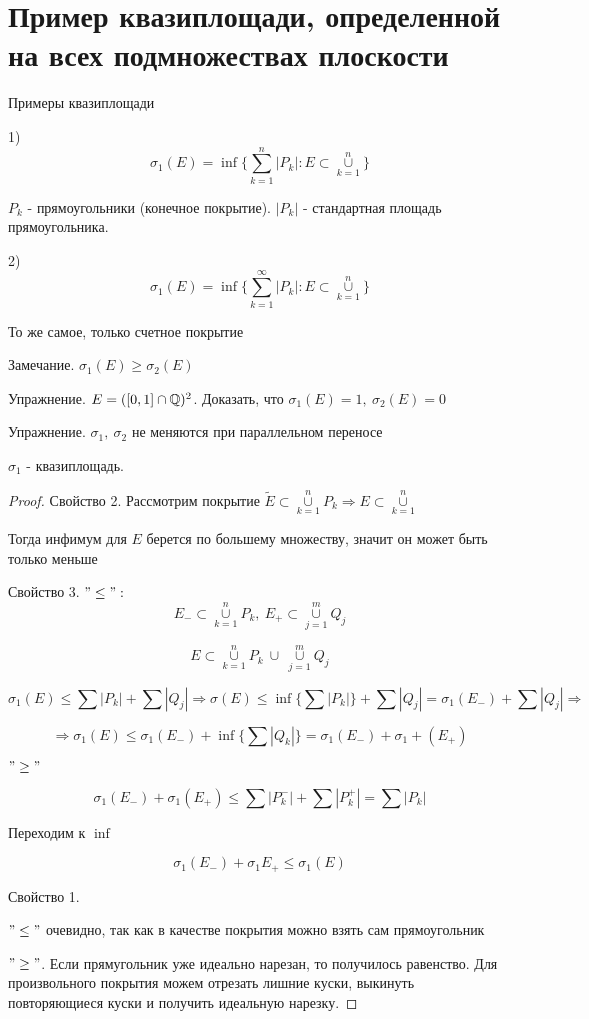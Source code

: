 \section{Пример квазиплощади, определенной на всех подмножествах плоскости}

Примеры квазиплощади

1)
\[\sigma_1(E) = \inf\{\sum_{k=1}^{n}|P_k| : E \subset \overset{n}{\underset{k=1}{\cup}}\} \]

$P_k$ - прямоугольники (конечное покрытие). $|P_k|$ - стандартная площадь прямоугольника.

2)
\[\sigma_1(E) = \inf\{\sum_{k=1}^{\infty}|P_k| : E \subset \overset{n}{\underset{k=1}{\cup}}\} \]

То же самое, только счетное покрытие

Замечание. $\sigma_1(E) \geq \sigma_2(E)$

Упражнение. $E = ([0, 1] \cap \mathbb{Q})^2$. Доказать, что $\sigma_1(E) = 1,\ \sigma_2(E) = 0$

Упражнение. $\sigma_1,\ \sigma_2$ не меняются при параллельном переносе

\begin{theorem}
    $\sigma_1$ - квазиплощадь.
\end{theorem}

\begin{proof}
    Свойство 2. Рассмотрим покрытие $\widetilde{E} \subset \overset{n}{\underset{k=1}{\cup}} P_k
    \Rightarrow E \subset \overset{n}{\underset{k=1}{\cup}}$

    Тогда инфимум для $E$ берется по большему множеству, значит он может быть только меньше

    Свойство 3. $"\leq":$
    \[E_{-} \subset \overset{n}{\underset{k=1}{\cup}} P_k,\ 
    E_{+} \subset \overset{m}{\underset{j=1}{\cup}} Q_j\]

    \[E \subset \overset{n}{\underset{k=1}{\cup}} P_k\ \cup\ \overset{m}{\underset{j=1}{\cup}} Q_j\]

    \[\sigma_1(E) \leq \sum |P_k| + \sum |Q_j| \Rightarrow \sigma(E) \leq \inf
    \{ \sum |P_k| \} + \sum |Q_j| = \sigma_1(E_{-}) + \sum |Q_j| \Rightarrow \]

    \[ \Rightarrow \sigma_1(E) \leq \sigma_1(E_{-}) + \inf \{ \sum |Q_k| \} =
    \sigma_1(E_{-}) + \sigma_1 + (E_{+}) \]

    $"\geq"$

    \[ \sigma_1(E_{-}) + \sigma_1(E_{+}) \leq \sum |P_k^{-}| + \sum |P_k^{+}| = \sum |P_k|\]

    Переходим к $\inf$

    \[ \sigma_1(E_{-}) + \sigma_1{E_{+}} \leq \sigma_1(E) \]

    Свойство 1.

    $"\leq"$ очевидно, так как в качестве покрытия можно взять сам прямоугольник

    $"\geq"$. Если прямугольник уже идеально нарезан, то получилось равенство.
    Для произвольного покрытия можем отрезать лишние куски, выкинуть повторяющиеся куски и получить идеальную нарезку.
\end{proof}